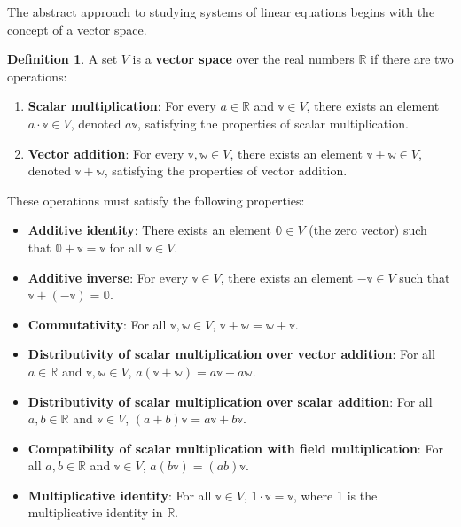 \documentclass[
]{book}
\providecommand{\tightlist}{%
  \setlength{\itemsep}{0pt}\setlength{\parskip}{0pt}}
\theoremstyle{definition}
\newtheorem{definition}{Definition}[chapter]
\theoremstyle{definition}
\theoremstyle{definition}
\theoremstyle{definition}
\theoremstyle{remark}
\begin{document}
The abstract approach to studying systems of linear equations begins with the concept of a vector space.

\begin{definition}

A set \(V\) is a \textbf{vector space} over the real numbers \(\mathbb{R}\) if there are two operations:

\begin{enumerate}
\def\labelenumi{\arabic{enumi}.}
\item
  \textbf{Scalar multiplication}: For every \(a \in \mathbb{R}\) and \(\mathbb{v} \in V\), there exists an element \(a \cdot \mathbb{v} \in V\), denoted \(a\mathbb{v}\), satisfying the properties of scalar multiplication.
\item
  \textbf{Vector addition}: For every \(\mathbb{v}, \mathbb{w} \in V\), there exists an element \(\mathbb{v} + \mathbb{w} \in V\), denoted \(\mathbb{v} + \mathbb{w}\), satisfying the properties of vector addition.
\end{enumerate}

These operations must satisfy the following properties:

\begin{itemize}
\tightlist
\item
  \textbf{Additive identity}: There exists an element \(\mathbb{0} \in V\) (the zero vector) such that \(\mathbb{0} + \mathbb{v} = \mathbb{v}\) for all \(\mathbb{v} \in V\).\\
\item
  \textbf{Additive inverse}: For every \(\mathbb{v} \in V\), there exists an element \(-\mathbb{v} \in V\) such that \(\mathbb{v} + (-\mathbb{v}) = \mathbb{0}\).\\
\item
  \textbf{Commutativity}: For all \(\mathbb{v}, \mathbb{w} \in V\), \(\mathbb{v} + \mathbb{w} = \mathbb{w} + \mathbb{v}\).\\
\item
  \textbf{Distributivity of scalar multiplication over vector addition}: For all \(a \in \mathbb{R}\) and \(\mathbb{v}, \mathbb{w} \in V\), \(a(\mathbb{v} + \mathbb{w}) = a\mathbb{v} + a\mathbb{w}\).\\
\item
  \textbf{Distributivity of scalar multiplication over scalar addition}: For all \(a, b \in \mathbb{R}\) and \(\mathbb{v} \in V\), \((a + b)\mathbb{v} = a\mathbb{v} + b\mathbb{v}\).\\
\item
  \textbf{Compatibility of scalar multiplication with field multiplication}: For all \(a, b \in \mathbb{R}\) and \(\mathbb{v} \in V\), \(a(b\mathbb{v}) = (ab)\mathbb{v}\).\\
\item
  \textbf{Multiplicative identity}: For all \(\mathbb{v} \in V\), \(1 \cdot \mathbb{v} = \mathbb{v}\), where 1 is the multiplicative identity in \(\mathbb{R}\).\\
\end{itemize}

\end{definition}
\end{document}
